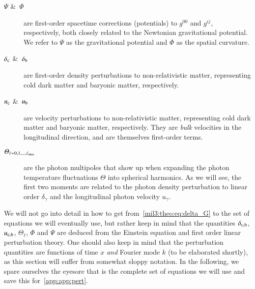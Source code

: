 \begin{description}
    \item [$\Psi$ \&~$\Phi$] are first-order spacetime corrections (potentials) to $g^{00}$ and $g^{ij}$, respectively, both closely related to the Newtonian gravitational potential. We refer to $\Psi$ as the gravitational potential and $\Phi$ as the spatial curvature.
    \item [$\delta_\mathrm{c}$ \&~$\delta_\mathrm{b}$] are first-order density perturbations to non-relativistic matter, representing cold dark matter and baryonic matter, respectively.
    \item [$u_\mathrm{c}$ \&~$u_\mathrm{b}$] are velocity perturbations to non-relativistic matter, representing cold dark matter and baryonic matter, respectively. They are \textit{bulk} velocities in the longitudinal direction, and are themselves first-order terms.
    \item [$\varTheta_{\ell= 0, 1, \dots, \ell_\mathrm{max}}$] are the photon multipoles that show up when expanding the photon temperature fluctuations $\Theta$ into spherical harmonics. As we will see, the first two moments are related to the photon density perturbation to linear order $\delta_\gamma$ and the longitudinal photon velocity $u_\gamma$.
\end{description}

We will not go into detail in how to get from~\cref{mil3:theo:eq:delta_G} to the set of equations we will eventually use, but rather keep in mind that the quantities $\delta_\mathrm{c,b}$, $u_\mathrm{c,b}$, $\Theta_\ell$, $\Phi$ and $\Psi$ are deduced from the Einstein equation and first order linear perturbation theory. One should also keep in mind that the perturbation quantities are functions of time $x$ \textit{and} Fourier mode $k$ (to be elaborated shortly), as this section will suffer from somewhat sloppy notation. In the following, we spare ourselves the eyesore that is the complete set of equations we will use and save this for~\cref{app:app:pert}. 


